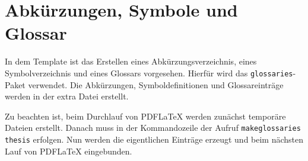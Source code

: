 %
\section{Abkürzungen, Symbole und Glossar}
In dem Template ist das Erstellen eines Abkürzungsverzeichnis, eines Symbolverzeichnis und eines Glossars vorgesehen. Hierfür wird das \texttt{glossaries}-Paket\citep{GlossariesPackage} verwendet. Die Abkürzungen, Symboldefinitionen und Glossareinträge werden in der extra Datei  erstellt. 

Zu beachten ist, beim Durchlauf von PDFLaTeX werden zunächst temporäre Dateien erstellt. Danach muss in der Kommandozeile der Aufruf \texttt{makeglossaries thesis} erfolgen. Nun werden die eigentlichen Einträge erzeugt und beim nächsten Lauf von PDFLaTeX eingebunden. 
